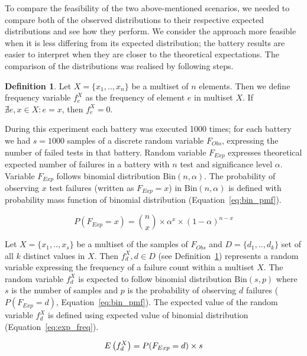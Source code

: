\documentclass[
  digital,  	%
  color,		%
  oneside,   	%
  12pt,
  nocover,
  notable,
  nolof,
  nolot,
]{fithesis3}
\theoremstyle{definition}
\newtheorem{definition}{Definition}[section]
\theoremstyle{remark}
\begin{document}
To compare the feasibility of the two above-mentioned scenarios, we needed to compare both of the observed distributions to their respective expected distributions and see how they perform. We consider the approach more feasible when it is less differing from its expected distribution; the battery results are easier to interpret when they are closer to the theoretical expectations. The comparison of the distributions was realised by following steps.

\begin{definition}
\label{def:freq}
Let $X = \{x_1, .. ,x_n\}$ be a multiset of $n$ elements. Then we define frequency variable $f_{e}^{X}$ as the frequency of element $e$ in multiset $X$. If $\nexists e, x \in X : e = x$, then $f_{e}^{X} = 0$.
\end{definition}

During this experiment each battery was executed 1000 times; for each battery we had $s = 1000$ samples of a discrete random variable $F_{Obs}$, expressing the number of failed tests in that battery. Random variable $F_{Exp}$ expresses theoretical expected number of failures in a battery with $n$ test and significance level $\alpha$. Variable $F_{Exp}$ follows binomial distribution $\text{Bin}(n, \alpha)$. The probability of observing $x$ test failures (written as $F_{Exp} = x$) in $\text{Bin}(n, \alpha)$ is defined with probability mass function of binomial distribution (Equation~\ref{eq:bin_pmf}).

\begin{equation}
\label{eq:bin_pmf}
P(F_{Exp} = x) = \binom nx \times \alpha^x \times (1-\alpha)^{n-x} 
\end{equation}

Let $X = \{x_1,..,x_s\}$ be a multiset of the samples of $F_{Obs}$ and $D = \{d_1,..,d_k\}$ set of all $k$ distinct values in $X$. Then $f_{d}^{X}, d \in D$ (see Definition~\ref{def:freq}) represents a random variable expressing the frequency of a failure count within a multiset $X$. The random variable $f_{d}^{X}$ is expected to follow binomial distribution $\text{Bin}(s, p)$ where $s$ is the number of samples and $p$ is the probability of observing $d$ failures ($P(F_{Exp} = d)$, Equation~\ref{eq:bin_pmf}). The expected value of the random variable $f_{d}^{X}$ is defined using expected value of binomial distribution (Equation~\ref{eq:exp_freq}).

\begin{equation}
\label{eq:exp_freq}
E\left(f_{d}^{X}\right) = P(F_{Exp} = d) \times s \\
\end{equation}
\end{document}

